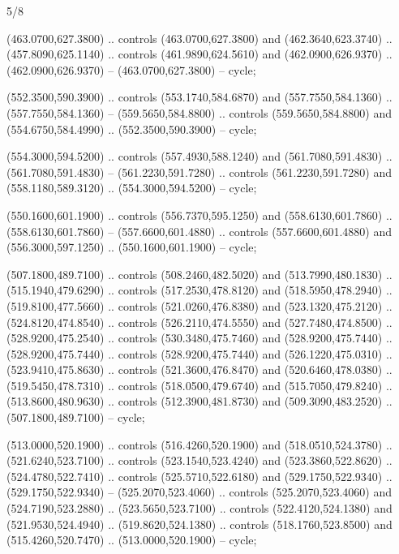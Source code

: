 \begin{flagdescription}{5/8}
\begin{scope}[shift={(m)}]
\begin{scope}[scale=\flagwidth/220,y=0.1mm, x=0.1mm, yscale=-1,shift={(-596,-360)}]
\begin{scope}[draw=black,line join=round,line cap=round,line width=0.381\lw]
\begin{scope}[fill=black]
 (463.0700,627.3800) .. controls (463.0700,627.3800) and
  (462.3640,623.3740) .. (457.8090,625.1140) .. controls (461.9890,624.5610) and
  (462.0900,626.9370) .. (462.0900,626.9370) -- (463.0700,627.3800) -- cycle;

 (552.3500,590.3900) .. controls (553.1740,584.6870) and
  (557.7550,584.1360) .. (557.7550,584.1360) -- (559.5650,584.8800) .. controls
  (559.5650,584.8800) and (554.6750,584.4990) .. (552.3500,590.3900) -- cycle;

 (554.3000,594.5200) .. controls (557.4930,588.1240) and
  (561.7080,591.4830) .. (561.7080,591.4830) -- (561.2230,591.7280) .. controls
  (561.2230,591.7280) and (558.1180,589.3120) .. (554.3000,594.5200) -- cycle;

 (550.1600,601.1900) .. controls (556.7370,595.1250) and
  (558.6130,601.7860) .. (558.6130,601.7860) -- (557.6600,601.4880) .. controls
  (557.6600,601.4880) and (556.3000,597.1250) .. (550.1600,601.1900) -- cycle;

 (507.1800,489.7100) .. controls (508.2460,482.5020) and
  (513.7990,480.1830) .. (515.1940,479.6290) .. controls (517.2530,478.8120) and
  (518.5950,478.2940) .. (519.8100,477.5660) .. controls (521.0260,476.8380) and
  (523.1320,475.2120) .. (524.8120,474.8540) .. controls (526.2110,474.5550) and
  (527.7480,474.8500) .. (528.9200,475.2540) .. controls (530.3480,475.7460) and
  (528.9200,475.7440) .. (528.9200,475.7440) .. controls (528.9200,475.7440) and
  (526.1220,475.0310) .. (523.9410,475.8630) .. controls (521.3600,476.8470) and
  (520.6460,478.0380) .. (519.5450,478.7310) .. controls (518.0500,479.6740) and
  (515.7050,479.8240) .. (513.8600,480.9630) .. controls (512.3900,481.8730) and
  (509.3090,483.2520) .. (507.1800,489.7100) -- cycle;

 (513.0000,520.1900) .. controls (516.4260,520.1900) and
  (518.0510,524.3780) .. (521.6240,523.7100) .. controls (523.1540,523.4240) and
  (523.3860,522.8620) .. (524.4780,522.7410) .. controls (525.5710,522.6180) and
  (529.1750,522.9340) .. (529.1750,522.9340) -- (525.2070,523.4060) .. controls
  (525.2070,523.4060) and (524.7190,523.2880) .. (523.5650,523.7100) .. controls
  (522.4120,524.1380) and (521.9530,524.4940) .. (519.8620,524.1380) .. controls
  (518.1760,523.8500) and (515.4260,520.7470) .. (513.0000,520.1900) -- cycle;


\end{scope}
\end{scope}
\end{scope}
\end{scope}
\end{flagdescription}
